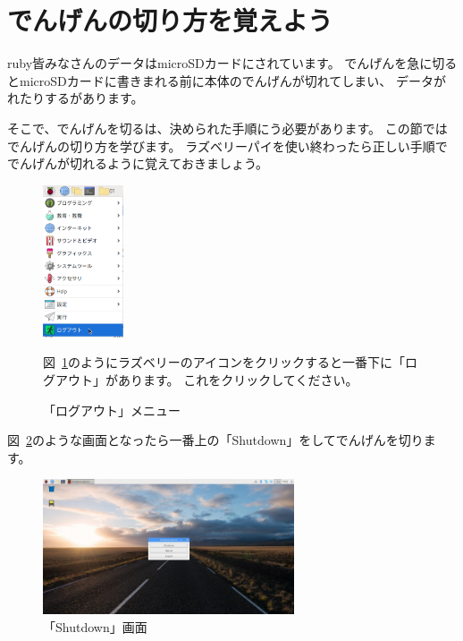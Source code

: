 \clearpage

\section{でんげんの切り方を覚えよう}
ruby{皆}{みな}さんのデータはmicroSDカードにされています。
でんげんを急に切るとmicroSDカードに書きまれる前に本体のでんげんが切れてしまい、
データがれたりするがあります。

そこで、でんげんを切るは、決められた手順にう必要があります。
この節ではでんげんの切り方を学びます。
ラズベリーパイを使い終わったら正しい手順ででんげんが切れるように覚えておきましょう。



\centering
\begin{figure}[H]
  \begin{minipage}{8cm}
    {\upshape
      \centering
      \includegraphics[height=4.5cm]{text01-img/textbook-img206.png}
      \caption{「ログアウト」メニュー}\label{fig:48}
    }
  \end{minipage}
  \begin{minipage}{7cm}
    図~\ref{fig:48}のようにラズベリーのアイコンをクリックすると一番下に「ログアウト」があります。
    これをクリックしてください。
  \end{minipage}
\end{figure}

\flushleft
\textcolor[rgb]{0.13333334,0.13333334,0.13333334}{図~\ref{fig:46}のような画面となったら一番上の「Shutdown」をしてでんげんを切ります。}

\begin{figure}[H]
  \centering
  \begin{minipage}{8cm}
    {\upshape
      \includegraphics[height=4.0cm]{text01-img/textbook-img208.jpg}
      \caption{「Shutdown」画面}\label{fig:46} 
    }
  \end{minipage}  
\end{figure}

